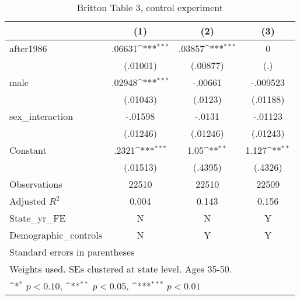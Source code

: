\begin{table}[htbp]\centering
\def\sym#1{\ifmmode^{#1}\else\(^{#1}\)\fi}
\caption{Britton Table 3, control experiment}
\begin{tabular}{l*{3}{c}}
\hline\hline
                    &\multicolumn{1}{c}{(1)}         &\multicolumn{1}{c}{(2)}         &\multicolumn{1}{c}{(3)}         \\
\hline
after1986           &      .06631\sym{***}&      .03857\sym{***}&           0         \\
                    &    (.01001)         &    (.00877)         &         (.)         \\
[1em]
male                &      .02948\sym{***}&     -.00661         &    -.009523         \\
                    &    (.01043)         &     (.0123)         &    (.01188)         \\
[1em]
sex\_interaction     &     -.01598         &      -.0131         &     -.01123         \\
                    &    (.01246)         &    (.01246)         &    (.01243)         \\
[1em]
Constant            &       .2321\sym{***}&        1.05\sym{**} &       1.127\sym{**} \\
                    &    (.01513)         &     (.4395)         &     (.4326)         \\
\hline
Observations        &       22510         &       22510         &       22509         \\
Adjusted \(R^{2}\)  &       0.004         &       0.143         &       0.156         \\
State\_yr\_FE         &           N         &           N         &           Y         \\
Demographic\_controls&           N         &           Y         &           Y         \\
\hline\hline
\multicolumn{4}{l}{\footnotesize Standard errors in parentheses}\\
\multicolumn{4}{l}{\footnotesize Weights used. SEs clustered at state level. Ages 35-50.}\\
\multicolumn{4}{l}{\footnotesize \sym{*} \(p<0.10\), \sym{**} \(p<0.05\), \sym{***} \(p<0.01\)}\\
\end{tabular}
\end{table}
